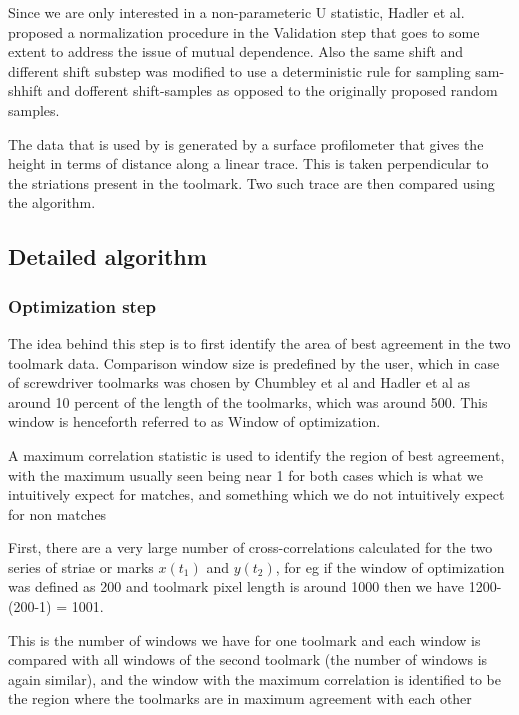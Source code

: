 \documentclass[12pt]{article}
\begin{document}
Since we are only interested in a non-parameteric U statistic, Hadler et
al. proposed a normalization procedure in the Validation step that goes
to some extent to address the issue of mutual dependence. Also the same
shift and different shift substep was modified to use a deterministic
rule for sampling sam-shhift and dofferent shift-samples as opposed to
the originally proposed random samples.

The data that is used by \citet{chumbley} is generated by a surface
profilometer that gives the height in terms of distance along a linear
trace. This is taken perpendicular to the striations present in the
toolmark. Two such trace are then compared using the algorithm.

\subsection{Detailed algorithm}\label{detailed-algorithm}

\subsubsection{Optimization step}\label{optimization-step}

The idea behind this step is to first identify the area of best
agreement in the two toolmark data. Comparison window size is predefined
by the user, which in case of screwdriver toolmarks was chosen by
Chumbley et al and Hadler et al as around 10 percent of the length of
the toolmarks, which was around 500. This window is henceforth referred
to as Window of optimization.

A maximum correlation statistic is used to identify the region of best
agreement, with the maximum usually seen being near 1 for both cases
which is what we intuitively expect for matches, and something which we
do not intuitively expect for non matches

First, there are a very large number of cross-correlations calculated
for the two series of striae or marks \(x(t_1)\) and \(y(t_2)\), for eg
if the window of optimization was defined as 200 and toolmark pixel
length is around 1000 then we have 1200-(200-1) = 1001.

This is the number of windows we have for one toolmark and each window
is compared with all windows of the second toolmark (the number of
windows is again similar), and the window with the maximum correlation
is identified to be the region where the toolmarks are in maximum
agreement with each other
\end{document}
